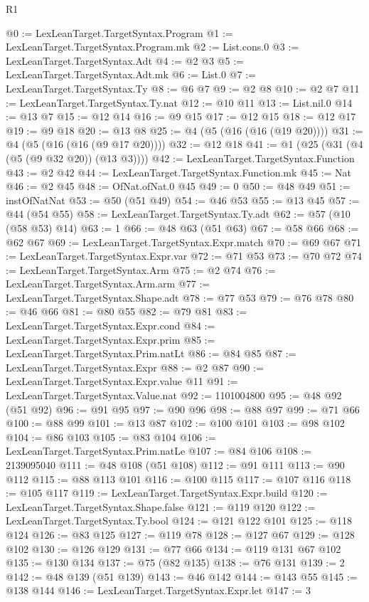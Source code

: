 \begin{lexlean}{R1}
\begin{coremodule}
@0 := LexLeanTarget.TargetSyntax.Program
@1 := LexLeanTarget.TargetSyntax.Program.mk
@2 := List.cons.{0}
@3 := LexLeanTarget.TargetSyntax.Adt
@4 := @2 @3
@5 := LexLeanTarget.TargetSyntax.Adt.mk
@6 := List.{0}
@7 := LexLeanTarget.TargetSyntax.Ty
@8 := @6 @7
@9 := @2 @8
@10 := @2 @7
@11 := LexLeanTarget.TargetSyntax.Ty.nat
@12 := @10 @11
@13 := List.nil.{0}
@14 := @13 @7
@15 := @12 @14
@16 := @9 @15
@17 := @12 @15
@18 := @12 @17
@19 := @9 @18
@20 := @13 @8
@25 := @4 (@5 (@16 (@16 (@19 @20))))
@31 := @4 (@5 (@16 (@16 (@9 @17 @20))))
@32 := @12 @18
@41 := @1 (@25 (@31 (@4 (@5 (@9 @32 @20)) (@13 @3))))
@42 := LexLeanTarget.TargetSyntax.Function
@43 := @2 @42
@44 := LexLeanTarget.TargetSyntax.Function.mk
@45 := Nat
@46 := @2 @45
@48 := OfNat.ofNat.{0} @45
@49 := 0
@50 := @48 @49
@51 := instOfNatNat
@53 := @50 (@51 @49)
@54 := @46 @53
@55 := @13 @45
@57 := @44 (@54 @55)
@58 := LexLeanTarget.TargetSyntax.Ty.adt
@62 := @57 (@10 (@58 @53) @14)
@63 := 1
@66 := @48 @63 (@51 @63)
@67 := @58 @66
@68 := @62 @67
@69 := LexLeanTarget.TargetSyntax.Expr.match
@70 := @69 @67
@71 := LexLeanTarget.TargetSyntax.Expr.var
@72 := @71 @53
@73 := @70 @72
@74 := LexLeanTarget.TargetSyntax.Arm
@75 := @2 @74
@76 := LexLeanTarget.TargetSyntax.Arm.arm
@77 := LexLeanTarget.TargetSyntax.Shape.adt
@78 := @77 @53
@79 := @76 @78
@80 := @46 @66
@81 := @80 @55
@82 := @79 @81
@83 := LexLeanTarget.TargetSyntax.Expr.cond
@84 := LexLeanTarget.TargetSyntax.Expr.prim
@85 := LexLeanTarget.TargetSyntax.Prim.natLt
@86 := @84 @85
@87 := LexLeanTarget.TargetSyntax.Expr
@88 := @2 @87
@90 := LexLeanTarget.TargetSyntax.Expr.value @11
@91 := LexLeanTarget.TargetSyntax.Value.nat
@92 := 1101004800
@95 := @48 @92 (@51 @92)
@96 := @91 @95
@97 := @90 @96
@98 := @88 @97
@99 := @71 @66
@100 := @88 @99
@101 := @13 @87
@102 := @100 @101
@103 := @98 @102
@104 := @86 @103
@105 := @83 @104
@106 := LexLeanTarget.TargetSyntax.Prim.natLe
@107 := @84 @106
@108 := 2139095040
@111 := @48 @108 (@51 @108)
@112 := @91 @111
@113 := @90 @112
@115 := @88 @113 @101
@116 := @100 @115
@117 := @107 @116
@118 := @105 @117
@119 := LexLeanTarget.TargetSyntax.Expr.build
@120 := LexLeanTarget.TargetSyntax.Shape.false
@121 := @119 @120
@122 := LexLeanTarget.TargetSyntax.Ty.bool
@124 := @121 @122 @101
@125 := @118 @124
@126 := @83 @125
@127 := @119 @78
@128 := @127 @67
@129 := @128 @102
@130 := @126 @129
@131 := @77 @66
@134 := @119 @131 @67 @102
@135 := @130 @134
@137 := @75 (@82 @135)
@138 := @76 @131
@139 := 2
@142 := @48 @139 (@51 @139)
@143 := @46 @142
@144 := @143 @55
@145 := @138 @144
@146 := LexLeanTarget.TargetSyntax.Expr.let
@147 := 3

\end{coremodule}
\end{lexlean}
